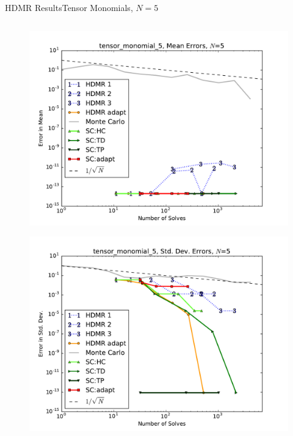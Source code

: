 \documentclass{beamer}
\begin{document}
\begin{frame}{HDMR Results}{Tensor Monomials, $N=5$}
\begin{columns}
\begin{column}{0.5\textwidth}
\begin{figure}[h!]
          \includegraphics[width=0.8\linewidth]{anlmodels/tensor_monomial_5_mean_errs}
        \end{figure}
        \vspace{-20pt}
        \begin{figure}[h!]
          \centering
          \includegraphics[width=0.8\linewidth]{anlmodels/tensor_monomial_5_variance_errs}
        \end{figure}
   \end{column}
 \end{columns}
\end{frame}
\end{document}
